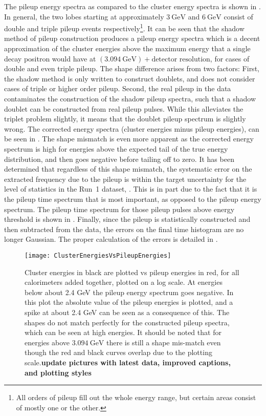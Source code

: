 The pileup energy spectra as compared to the cluster energy spectra is shown in . In general, the two lobes starting at approximately $\SI{3}{\GeV}$ and $\SI{6}{\GeV}$ consist of double and triple pileup events respectively\footnote{All orders of pileup fill out the whole energy range, but certain areas consist of mostly one or the other.}. It can be seen that the shadow method of pileup construction produces a pileup energy spectra which is a decent approximation of the cluster energies above the maximum energy that a single decay positron would have at $(\SI{3.094}{\GeV}) + \text{detector resolution}$, for cases of double and even triple pileup. The shape difference arises from two factors: First, the shadow method is only written to construct doublets, and does not consider cases of triple or higher order pileup. Second, the real pileup in the data contaminates the construction of the shadow pileup spectra, such that a shadow doublet can be constructed from real pileup pulses. While this alleviates the triplet problem slightly, it means that the doublet pileup spectrum is slightly wrong. The corrected energy spectra (cluster energies minus pileup energies), can be seen in . The shape mismatch is even more apparent as the corrected energy spectrum is high for energies above the expected tail of the true energy distribution, and then goes negative before tailing off to zero. It has been determined that regardless of this shape mismatch, the systematic error on the extracted \wa frequency due to the pileup is within the target uncertainty for the level of statistics in the Run~1 dataset, . This is in part due to the fact that it is the pileup time spectrum that is most important, as opposed to the pileup energy spectrum. The pileup time spectrum for those pileup pulses above energy threshold is shown in . Finally, since the pileup is statistically constructed and then subtracted from the data, the errors on the final time histogram are no longer Gaussian. The proper calculation of the errors is detailed in .


    \begin{figure}[]
        \centering
        \texttt{[image: ClusterEnergiesVsPileupEnergies]}
        \caption[Cluster energies vs pileup energies]{Cluster energies in black are plotted vs pileup energies in red, for all calorimeters added together, plotted on a log scale. At energies below about 2.4 GeV the pileup energy spectrum goes negative. In this plot the absolute value of the pileup energies is plotted, and a spike at about 2.4 GeV can be seen as a consequence of this. The shapes do not match perfectly for the constructed pileup spectra, which can be seen at high energies. It should be noted that for energies above $\SI{3.094}{\GeV}$ there is still a shape mis-match even though the red and black curves overlap due to the plotting scale.\textbf{update pictures with latest data, improved captions, and plotting styles}}    
        \label{fig:ClusterEnergiesVsPileupEnergies}
    \end{figure}


